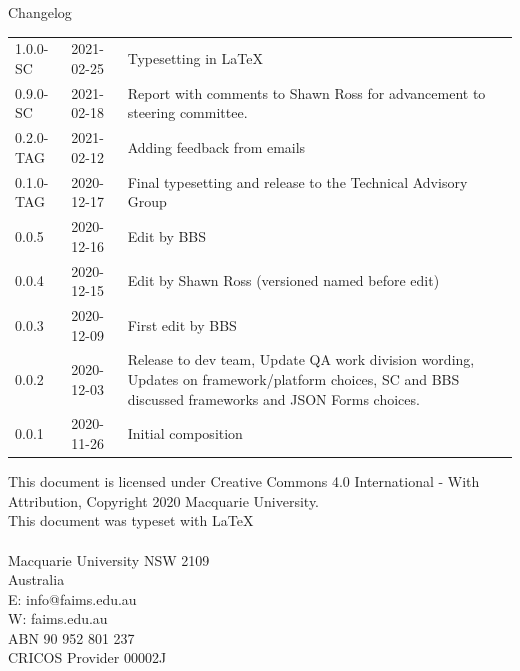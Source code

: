\documentclass[a4paper,headings=small fontsize=10pt]{scrreprt}
\begin{document}
\pagebreak
\NoBgThispage
\makeatletter
\def\verbatim@font{\normalfont}
\makeatother


\textcolor{faimsblue}{Changelog}

\begin{tabular}{@{}l l p{}}
1.0.0-SC & 2021-02-25 & Typesetting in \LaTeX{}\\
0.9.0-SC & 2021-02-18 & Report with comments to Shawn Ross for  advancement to steering committee. \\
0.2.0-TAG & 2021-02-12 & Adding feedback from emails \\
0.1.0-TAG & 2020-12-17 & Final typesetting and release to the Technical Advisory Group \\
0.0.5 & 2020-12-16 & Edit by BBS \\
0.0.4 & 2020-12-15 & Edit by Shawn Ross (versioned named before edit) \\
0.0.3 & 2020-12-09 & First edit by BBS \\
0.0.2 & 2020-12-03 & Release to dev team, Update QA work division wording, Updates on framework/platform choices, SC and BBS discussed frameworks and JSON Forms choices. \\
0.0.1 & 2020-11-26 & Initial composition \\

\end{tabular}
\vfill
{\footnotesize
This document is licensed under Creative Commons 4.0 International - With Attribution, Copyright 2020 Macquarie University. 
\\
This document was typeset with \LaTeX{}
\\
\\
Macquarie University NSW 2109 \\ Australia \\
E: info@faims.edu.au \\
W: faims.edu.au \\ 
ABN 90 952 801 237 \\
CRICOS Provider 00002J} 
\pagebreak
\pagestyle{fancy}


\end{document}
